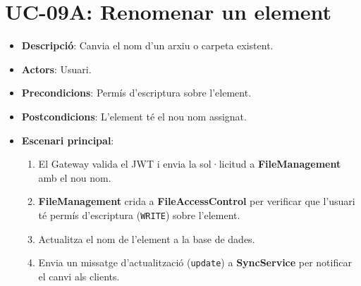 \section{UC-09A: Renomenar un element}
\begin{itemize}
    \item \textbf{Descripció}: Canvia el nom d'un arxiu o carpeta existent.
    \item \textbf{Actors}: Usuari.
    \item \textbf{Precondicions}: Permís d'escriptura sobre l'element.
    \item \textbf{Postcondicions}: L'element té el nou nom assignat.
    \item \textbf{Escenari principal}:
    \begin{enumerate}
        \item El Gateway valida el JWT i envia la sol·licitud a \textbf{FileManagement} amb el nou nom.
        \item \textbf{FileManagement} crida a \textbf{FileAccessControl} per verificar que l'usuari té permís d'escriptura (\texttt{WRITE}) sobre l'element.
        \item Actualitza el nom de l'element a la base de dades.
        \item Envia un missatge d'actualització (\texttt{update}) a \textbf{SyncService} per notificar el canvi als clients.
    \end{enumerate}
\end{itemize}

